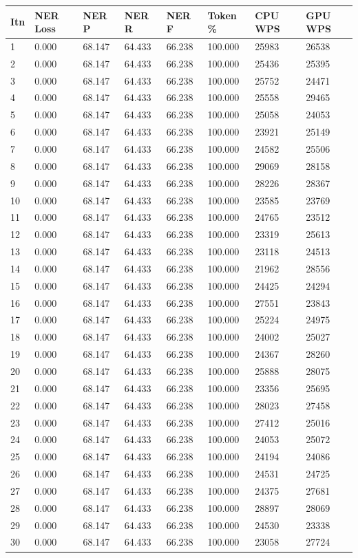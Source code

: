 \documentclass[12pt,a4paper,]{scrartcl}
\begin{document}
\begin{longtable}[]{@{}llllllll@{}}
\toprule
Itn & NER Loss & NER P & NER R & NER F & Token \% & CPU WPS & GPU WPS\tabularnewline
\midrule
\endhead
1 & 0.000 & 68.147 & 64.433 & 66.238 & 100.000 & 25983 & 26538\tabularnewline
2 & 0.000 & 68.147 & 64.433 & 66.238 & 100.000 & 25436 & 25395\tabularnewline
3 & 0.000 & 68.147 & 64.433 & 66.238 & 100.000 & 25752 & 24471\tabularnewline
4 & 0.000 & 68.147 & 64.433 & 66.238 & 100.000 & 25558 & 29465\tabularnewline
5 & 0.000 & 68.147 & 64.433 & 66.238 & 100.000 & 25058 & 24053\tabularnewline
6 & 0.000 & 68.147 & 64.433 & 66.238 & 100.000 & 23921 & 25149\tabularnewline
7 & 0.000 & 68.147 & 64.433 & 66.238 & 100.000 & 24582 & 25506\tabularnewline
8 & 0.000 & 68.147 & 64.433 & 66.238 & 100.000 & 29069 & 28158\tabularnewline
9 & 0.000 & 68.147 & 64.433 & 66.238 & 100.000 & 28226 & 28367\tabularnewline
10 & 0.000 & 68.147 & 64.433 & 66.238 & 100.000 & 23585 & 23769\tabularnewline
11 & 0.000 & 68.147 & 64.433 & 66.238 & 100.000 & 24765 & 23512\tabularnewline
12 & 0.000 & 68.147 & 64.433 & 66.238 & 100.000 & 23319 & 25613\tabularnewline
13 & 0.000 & 68.147 & 64.433 & 66.238 & 100.000 & 23118 & 24513\tabularnewline
14 & 0.000 & 68.147 & 64.433 & 66.238 & 100.000 & 21962 & 28556\tabularnewline
15 & 0.000 & 68.147 & 64.433 & 66.238 & 100.000 & 24425 & 24294\tabularnewline
16 & 0.000 & 68.147 & 64.433 & 66.238 & 100.000 & 27551 & 23843\tabularnewline
17 & 0.000 & 68.147 & 64.433 & 66.238 & 100.000 & 25224 & 24975\tabularnewline
18 & 0.000 & 68.147 & 64.433 & 66.238 & 100.000 & 24002 & 25027\tabularnewline
19 & 0.000 & 68.147 & 64.433 & 66.238 & 100.000 & 24367 & 28260\tabularnewline
20 & 0.000 & 68.147 & 64.433 & 66.238 & 100.000 & 25888 & 28075\tabularnewline
21 & 0.000 & 68.147 & 64.433 & 66.238 & 100.000 & 23356 & 25695\tabularnewline
22 & 0.000 & 68.147 & 64.433 & 66.238 & 100.000 & 28023 & 27458\tabularnewline
23 & 0.000 & 68.147 & 64.433 & 66.238 & 100.000 & 27412 & 25016\tabularnewline
24 & 0.000 & 68.147 & 64.433 & 66.238 & 100.000 & 24053 & 25072\tabularnewline
25 & 0.000 & 68.147 & 64.433 & 66.238 & 100.000 & 24194 & 24086\tabularnewline
26 & 0.000 & 68.147 & 64.433 & 66.238 & 100.000 & 24531 & 24725\tabularnewline
27 & 0.000 & 68.147 & 64.433 & 66.238 & 100.000 & 24375 & 27681\tabularnewline
28 & 0.000 & 68.147 & 64.433 & 66.238 & 100.000 & 28897 & 28069\tabularnewline
29 & 0.000 & 68.147 & 64.433 & 66.238 & 100.000 & 24530 & 23338\tabularnewline
30 & 0.000 & 68.147 & 64.433 & 66.238 & 100.000 & 23058 & 27724\tabularnewline
\bottomrule
\end{longtable}
\end{document}

